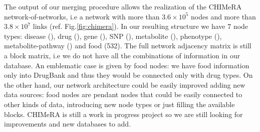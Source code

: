 \documentclass{standalone}
\begin{document}
The output of our merging procedure allows the realization of the \textsf{CHIMeRA} network-of-networks, i.e a network with more than $3.6\times10^5$ nodes and more than $3.8\times10^7$ links (ref. Fig.\ref{fig:chimera}).
In our resulting structure we have $7$ node types: disease (), drug (), gene (), SNP (), metabolite (), phenotype (), metabolite-pathway () and food (532).
The full network adjacency matrix is still a block matrix, i.e we do not have all the combinations of information in our database.
An emblematic case is given by food nodes: we have food information only into DrugBank and thus they would be connected only with drug types.
On the other hand, our network architecture could be easily improved adding new data sources: food nodes are pendant nodes that could be easily connected to other kinds of data, introducing new node types or just filling the available blocks.
\textsf{CHIMeRA} is still a work in progress project so we are still looking for improvements and new databases to add.


\end{document}
